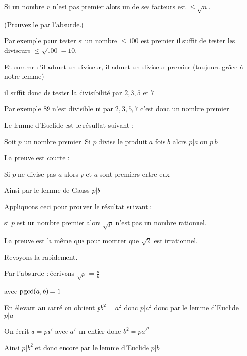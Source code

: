 Si un nombre $n$ n'est pas premier alors un de ses facteurs est $\le \sqrt{n}$.

(Prouvez le par l'absurde.)

\change

Par exemple pour tester si un nombre $\le 100$ est premier
il suffit de tester les diviseurs $\le \sqrt{100}=10$.

\change

Et comme s'il admet un diviseur, il admet un diviseur premier (toujours 
grâce à notre lemme) 

il suffit donc de tester la divisibilité par $2, 3, 5$ et $7$


\change
  Par exemple $89$ n'est divisible ni par $2,3,5,7$ c'est donc un nombre premier


\diapo


Le lemme d'Euclide est le résultat suivant : 

Soit $p$ un nombre premier.
Si $p$ divise le produit $a$ fois $b$ alors $p|a$ ou $p | b$


\change

La preuve est courte :

Si $p$ ne divise pas $a$ alors $p$ et $a$ sont premiers entre eux 

\change

Ainsi par le lemme de Gauss $p | b$

\change

Appliquons ceci pour prouver le résultat suivant : 

si $p$ est un nombre premier alors $\sqrt{p}$ n'est pas un nombre rationnel.

\change

La preuve est la même que pour montrer que $\sqrt 2$ est irrationnel.

Revoyons-la rapidement. 

Par l'absurde : écrivons $\sqrt p =\frac ab$

avec $\mathop{\mathrm{pgcd}}\nolimits(a,b)=1$

\change

En élevant au carré on obtient
$p b^2 = a^2$ donc $p | a^2$ donc par le lemme d'Euclide $p | a$

\change

 On écrit $a = p a'$ avec $a'$ un entier donc $b^2 = p a'^2$

\change

 Ainsi $p | b^2$ et donc encore par le lemme d'Euclide $p|b$

